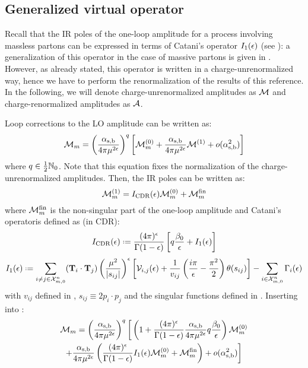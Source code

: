 \subsection{Generalized virtual operator}

Recall that the IR poles of the one-loop amplitude for a process involving massless partons can be expressed in terms of Catani's operator $ I_1(\epsilon) $ (see ): a generalization of this operator in the case of massive partons is given in \cite{Catani-2001}. However, as already stated, this operator is written in a charge-unrenormalized way, hence we have to perform the renormalization of the results of this reference. In the following, we will denote charge-unrenormalized amplitudes as $ \mathcal{M} $ and charge-renormalized amplitudes as $ \mathcal{A} $.

Loop corrections to the LO amplitude can be written as:
\begin{equation}
  \mathcal{M}_m = \left( \frac{\alpha_\text{s,b}}{4\pi \mu^{2\epsilon}} \right)^q \left[ \mathcal{M}_m^{(0)} + \frac{\alpha_\text{s,b}}{4\pi \mu^{2\epsilon}} \mathcal{M}^{(1)} + o(\alpha_\text{s,b}^2) \right]
  \label{eq:ampl-non-ren}
\end{equation}
where $ q \in \frac{1}{2} \mathbb{N}_0 $. Note that this equation fixes the normalization of the charge-unrenormalized amplitudes. Then, the IR poles can be written as:
\begin{equation}
  \mathcal{M}_m^{(1)} = I_\text{CDR}(\epsilon) \mathcal{M}_m^{(0)} + \mathcal{M}_m^\text{fin}
  \label{eq:gen-cat-form}
\end{equation}
where $ \mathcal{M}_m^\text{fin} $ is the non-singular part of the one-loop amplitude and Catani's operator\footnotemark is defined as (in CDR):
\begin{equation}
  \irs(\de) \defeq \frac{(4\pi)^\de}{\Gamma(1-\de)} \left[ q \frac{\beta_0}{\de} + \ioo(\de) \right]
\end{equation}
\begin{equation}
  \ioo(\de) \defeq \sum_{i \neq j \in \fsp{n}{m}} (\cc) \left( \frac{\mu^2}{\abs{s_{ij}}} \right)^\de \left[ \ns_{i,j}(\de) + \frac{1}{v_{ij}} \left( \frac{i\pi}{\de} - \frac{\pi^2}{2} \right) \theta(s_{ij}) \right] - \sum_{i \in \fsp{n}{m}} \Gamma_i(\de)
  \label{eq:gen-cat}
\end{equation}
with $ v_{ij} $ defined in , $ s_{ij} \equiv 2 p_i \cdot p_j $ and the singular functions defined in . Inserting  into :
\begin{multline*}
  \mathcal{M}_m = \left( \frac{\alpha_\text{s,b}}{4\pi \mu^{2\epsilon}} \right)^q \bigg[ \left( 1 + \frac{(4\pi)^\epsilon}{\Gamma(1-\epsilon)} \frac{\alpha_\text{s,b}}{4\pi \mu^{2\epsilon}} q \frac{\beta_0}{\epsilon} \right) \mathcal{M}_m^{(0)} \\
  + \frac{\alpha_\text{s,b}}{4\pi \mu^{2\epsilon}} \left( \frac{(4\pi)^\epsilon}{\Gamma(1-\epsilon)} I_1(\epsilon) \mathcal{M}_m^{(0)} + \mathcal{M}_m^\text{fin} \right) + o(\alpha_\text{s,b}^2) \bigg]
\end{multline*}
